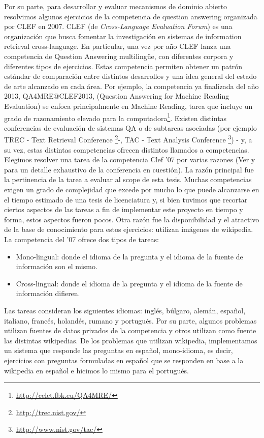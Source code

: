 Por su parte, para desarrollar y evaluar mecanismos de dominio abierto resolvimos algunos ejercicios de la competencia de question answering organizada por CLEF
en 2007. CLEF (de \textit{Cross-Language Evaluation Forum}) es una organización que busca fomentar la investigación en sistemas de information retrieval cross-language. En particular, una vez por año CLEF lanza una competencia de Question Answering multilingüe, con diferentes corpora y diferentes tipos de ejercicios. Estas competencia permiten obtener un patrón estándar de comparación entre distintos desarrollos y una idea general del estado de arte alcanzado en cada área.
Por ejemplo, la competencia ya finalizada del año 2013, QA4MRE@CLEF2013, (Question Answering for Machine Reading Evaluation) se enfoca principalmente en Machine Reading, tarea que incluye un grado de razonamiento elevado para la computadora\footnote{\url{http://celct.fbk.eu/QA4MRE/}}. Existen distintas conferencias de evaluación de sistemas QA o de subtareas asociadas (por ejemplo TREC - Text Retrieval Conference \footnote{\url{http://trec.nist.gov/}}-, TAC - Text Analysis Conference \footnote{\url{http://www.nist.gov/tac/}}) - y, a su vez, estas distintas competencias ofrecen distintos llamados a competencias. Elegimos resolver una tarea de la competencia Clef '07  por varias razones (Ver \cite{GuidelineClef07} y \cite{OverviewClef07} para un detalle exhaustivo de la conferencia en cuestión). La razón principal fue la pertinencia de la tarea a evaluar al scope de esta tesis. Muchas competencias exigen un grado de complejidad que excede por mucho lo que puede alcanzarse en el tiempo estimado de una tesis de licenciatura y, si bien tuvimos que recortar ciertos aspectos de las tareas a fin de implementar este proyecto en tiempo y forma, estos aspectos fueron pocos.
Otra razón fue la disponibilidad y el atractivo de la base de conocimiento para estos ejercicios: utilizan imágenes de wikipedia.
La competencia del '07 ofrece dos tipos de tareas:
\begin{itemize}
\item Mono-lingual: donde el idioma de la pregunta y el idioma de la fuente de información son el mismo.
\item Cross-lingual: donde el idioma de la pregunta y el idioma de la fuente de información difieren.
\end{itemize}
Las tareas consideran los siguientes idiomas: inglés, búlgaro, alemán, español, italiano, francés, holandés, rumano y portugués. Por su parte, algunos problemas utilizan fuentes de datos privados de la competencia y otros utilizan como fuente las distintas wikipedias. De los problemas que utilizan wikipedia, implementamos un sistema que responde las preguntas en español, mono-idioma, es decir, ejercicios con preguntas formuladas en español que se responden en base a la wikipedia en español e hicimos lo mismo para el portugués.
